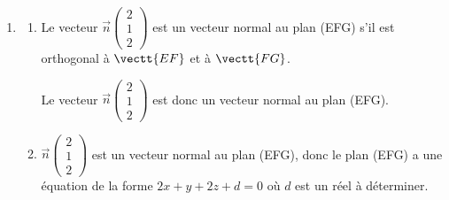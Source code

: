 \begin{enumerate}
\begin{enumerate}
$\mathcal{A}=\dfrac{\text{EH}\times \text{FG}}{2}$.		


Donc l'aire du triangle est en cm$^2$: 
$\mathcal{A}= \dfrac{3\sqrt{2}\times 4\sqrt{2}}{2}=12$.

	\end{enumerate}
\item
	\begin{enumerate}
		\item Le vecteur $\vec{n}\begin{pmatrix}2 \\ 1 \\ 2\end{pmatrix}$ est un vecteur normal au plan (EFG) s'il est orthogonal à $\vectt{EF}$ et à $\vectt{FG}$.
		

Le vecteur $\vec{n}\begin{pmatrix}2 \\ 1 \\ 2\end{pmatrix}$ est donc un vecteur normal au plan (EFG).
		\item%
$\vec{n}\begin{pmatrix}2 \\ 1 \\ 2\end{pmatrix}$ est  un vecteur normal au plan (EFG), donc le plan (EFG) a une équation de la forme $2x+y+2z+d=0$ où $d$ est un réel à déterminer.


\end{enumerate}
\end{enumerate}
